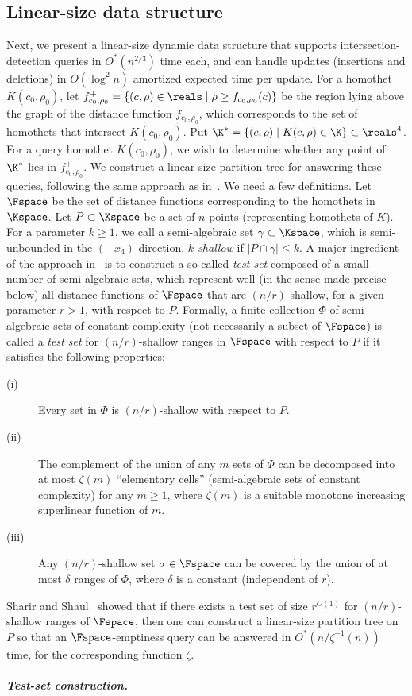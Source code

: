 \subsection{Linear-size data structure}
\label{subsec:linear}
%
Next, we present a linear-size dynamic data structure that supports intersection-detection queries 
in $O^*(n^{2/3})$ time each, and can handle updates (insertions and deletions) in $O(\log^2 n)$ 
amortized expected time per update.
%
For a homothet $K(c_0,\rho_0)$, let $f_{c_0,\rho_0}^+ = \{(c,\rho) \in \reals \mid \rho \ge f_{c_0,\rho_0}(c) \}$ 
be the region lying above the graph of the distance function $f_{c_0,\rho_0}$, which corresponds to the set of 
homothets that intersect $K({c_0,\rho_0})$. Put $\K^* = \{(c,\rho) \mid K(c,\rho) \in\K\}\subset\reals^4$.
For a query homothet $K(c_0,\rho_0)$, we wish to determine whether any point of $\K^*$ 
lies in $f_{c_0,\rho_0}^+$. We construct a linear-size partition tree for answering these queries, 
following the same approach as in~\cite{AM95,Mat92,ShSh}. We need a few definitions. 
Let $\Fspace$ be the set of distance functions corresponding to the homothets in $\Kspace$.
Let $P \subset \Kspace$ be a set of $n$ points (representing homothets of $K$).
For a parameter $k\ge 1$, we call a semi-algebraic set 
$\gamma \subset \Kspace$, which is semi-unbounded in the $(-x_4)$-direction,
\emph{$k$-shallow} if $|P \cap \gamma| \le k$. 
A major ingredient of the approach in~\cite{Mat92,ShSh} is to construct a 
so-called \emph{test set} composed of a small number of semi-algebraic sets, which
represent well (in the sense made precise below) all distance functions of $\Fspace$ 
that are $(n/r)$-shallow, for a given parameter $r>1$, with respect to $P$. 
Formally, a finite collection $\Phi$ of semi-algebraic sets of constant complexity (not necessarily 
a subset of $\Fspace$) is called a \emph{test set} for $(n/r)$-shallow ranges in $\Fspace$ with 
respect to $P$ if it satisfies the following properties: 
%
\medskip
  \begin{description}
\item[(i)]
  Every set in $\Phi$ is $(n/r)$-shallow with respect to $P$. 
\item[(ii)]
  The complement of the union of any $m$ sets of $\Phi$ can be decomposed 
  into at most $\zeta(m)$ ``elementary cells'' (semi-algebraic sets of constant complexity) for any $m\ge 1$, 
  where $\zeta(m)$ is a suitable monotone increasing superlinear function of $m$. 
\item[(iii)]
  Any $(n/r)$-shallow set $\sigma\in \Fspace$ can be covered by the union 
  of at most $\delta$ ranges of $\Phi$, where $\delta$ is a constant (independent of $r$).
\end{description}
%
\medskip
Sharir and Shaul~\cite{ShSh} showed that if there exists a test set of size $r^{O(1)}$ for $(n/r)$-shallow 
ranges of $\Fspace$, then one can construct a linear-size partition tree on $P$ so that an
$\Fspace$-emptiness query can be answered in $O^*(n/\zeta^{-1}(n))$ time, for the corresponding function $\zeta$. 
%
\ifsocgproc 
\subparagraph*{Test-set construction.}
\else
